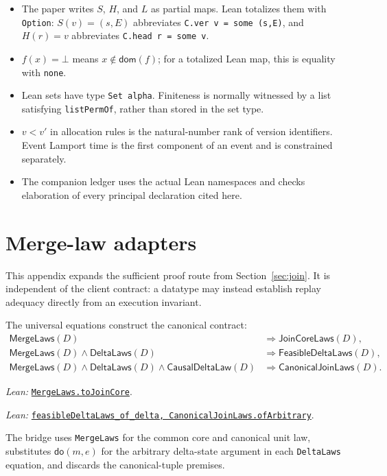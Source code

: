 \documentclass[11pt]{article}
\theoremstyle{definition}
\newcommand{\doop}{\mathsf{do}}
\newcommand{\none}{\bot}
\newcommand{\lean}[1]{\texttt{#1}}
\newcommand{\src}[2]{\href{../../#1}{\texttt{#2}}}
\newcommand{\anchor}[2]{\par\smallskip\noindent\emph{Lean: }\src{#1}{#2}.}
\begin{document}
\begin{itemize}
\item The paper writes $S$, $H$, and $L$ as partial maps. Lean totalizes them
with \lean{Option}: $S(v)=(s,E)$ abbreviates
\lean{C.ver v = some (s,E)}, and $H(r)=v$ abbreviates
\lean{C.head r = some v}.
\item $f(x)=\none$ means $x\notin\mathsf{dom}(f)$; for a totalized Lean map,
this is equality with \lean{none}.
\item Lean sets have type \lean{Set alpha}. Finiteness is normally witnessed by
a list satisfying \lean{listPermOf}, rather than stored in the set type.
\item $v<v'$ in allocation rules is the natural-number rank of version
identifiers. Event Lamport time is the first component of an event and is
constrained separately.
\item The companion ledger uses the actual Lean namespaces and checks
elaboration of every principal declaration cited here.
\end{itemize}

\section{Merge-law adapters}
\label{app:merge-adapters}

This appendix expands the sufficient proof route from Section~\ref{sec:join}.
It is independent of the client contract: a datatype may instead establish
replay adequacy directly from an execution invariant.

The universal equations construct the canonical contract:
\[
\begin{aligned}
 \mathsf{MergeLaws}(D)&\Longrightarrow\mathsf{JoinCoreLaws}(D),\\
 \mathsf{MergeLaws}(D)\land\mathsf{DeltaLaws}(D)
 &\Longrightarrow\mathsf{FeasibleDeltaLaws}(D),\\
 \mathsf{MergeLaws}(D)\land\mathsf{DeltaLaws}(D)
 \land\mathsf{CausalDeltaLaw}(D)
 &\Longrightarrow\mathsf{CanonicalJoinLaws}(D).
\end{aligned}
\]
\anchor{Sal/MRDTs/Framework/MergeLaws.lean}{MergeLaws.toJoinCore}
\anchor{Sal/MRDTs/Metatheory/Adequacy.lean}
  {feasibleDeltaLaws\_of\_delta, CanonicalJoinLaws.ofArbitrary}

The bridge uses \lean{MergeLaws} for the common core and canonical unit law,
substitutes $\doop(m,e)$ for the arbitrary delta-state argument in each
\lean{DeltaLaws} equation, and discards the canonical-tuple premises.
\end{document}
